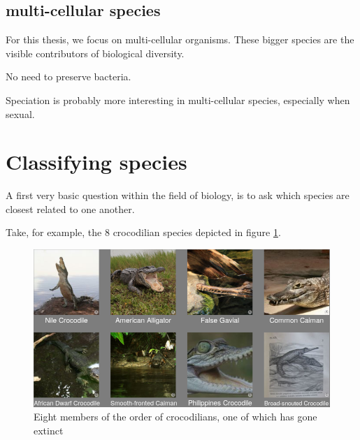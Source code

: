 \subsection{multi-cellular species}

For this thesis, we focus on multi-cellular organisms.
These bigger species are the visible contributors of
biological diversity. 

No need to preserve bacteria.

Speciation is probably more interesting in multi-cellular species, especially
when sexual.

\section{Classifying species}

A first very basic question within the field of biology,
is to ask which species are closest related to
one another. 

Take, for example, the 8 crocodilian species 
depicted in figure \ref{fig:crocodialians}.

\begin{figure}[H]
  \includegraphics[width=1.0\textwidth]{crocodilians.png}
  \caption{
    Eight members of the order of crocodilians, one of which
    has gone extinct
  }
  \label{fig:crocodialians}
\end{figure}

